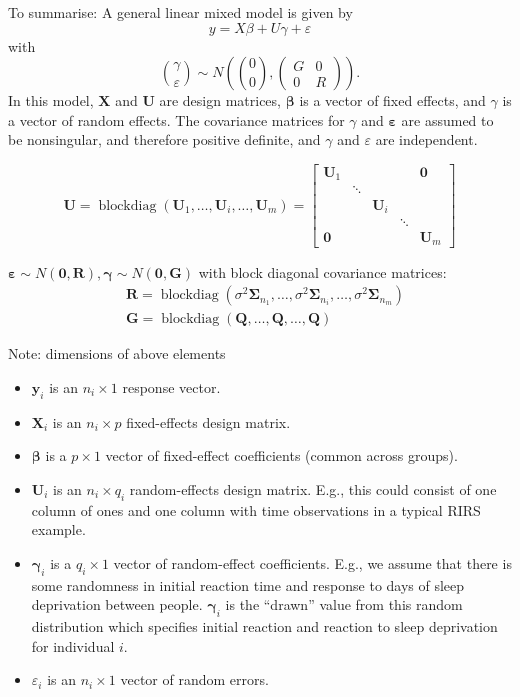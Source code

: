 \documentclass[11pt, %
	oneside, %
	english, %
	onehalfspacing, %
	]{article} %
\numberwithin{equation}{section}
\begin{document}
To summarise: A general linear mixed model is given by
$$
y=X \beta+U \gamma+\varepsilon
$$
with
$$
\binom{\gamma}{\varepsilon} \sim N\left(\binom{0}{0},\left(\begin{array}{ll}
G & 0 \\
0 & R
\end{array}\right)\right) .
$$
In this model, $\mathbf{X}$ and $\mathbf{U}$ are design matrices, $\mathbf{\beta}$ is a vector of fixed effects, and $\gamma$ is a vector of random effects. The covariance matrices for $\gamma$ and $\mathbf{\varepsilon}$ are assumed to be nonsingular, and therefore positive definite, and $\gamma$ and $\varepsilon$ are independent.

\begin{equation*}
    \mathbf{U}=\operatorname{blockdiag}\left(\mathbf{U}_1, \ldots, \mathbf{U}_i, \ldots, \mathbf{U}_m\right)=
    \begin{bmatrix}
        \mathbf{U}_1 & & & & \mathbf{0} \\
        & \ddots & & & \\
        & & \mathbf{U}_i & & \\
        & & & \ddots & \\
        \mathbf{0}& & & & \mathbf{U}_m
    \end{bmatrix}
\end{equation*}

$\mathbf{\varepsilon} \sim N (\mathbf{0}, \mathbf{R}), \mathbf{\gamma} \sim N(\mathbf{0}, \mathbf{G})$ with block diagonal covariance matrices:
\begin{align*}
    & \mathbf{R}=\operatorname{blockdiag}\left(\sigma^2 \mathbf{\Sigma}_{n_1}, \ldots, \sigma^2 \mathbf{\Sigma}_{n_i}, \ldots, \sigma^2 \mathbf{\Sigma}_{n_m}\right) \\
    & \mathbf{G}=\operatorname{blockdiag}(\mathbf{Q}, \ldots, \mathbf{Q}, \ldots, \mathbf{Q})
\end{align*}

Note: dimensions of above elements
\begin{itemize}
	\item $\boldsymbol{y}_i$ is an $n_i \times 1$ response vector.
	\item $\boldsymbol{X}_i$ is an $n_i \times p$ fixed-effects design matrix.
	\item $\boldsymbol{\beta}$ is a $p \times 1$ vector of fixed-effect coefficients (common across groups).
	\item $\boldsymbol{U}_i$ is an $n_i \times q_i$ random-effects design matrix. E.g., this could consist of one column of ones and one column with time observations in a typical RIRS example.
	\item $\boldsymbol{\gamma}_i$ is a $q_i \times 1$ vector of random-effect coefficients. E.g., we assume that there is some randomness in initial reaction time and response to days of sleep deprivation between people. $\boldsymbol{\gamma}_i$ is the ``drawn'' value from this random distribution which specifies initial reaction and reaction to sleep deprivation for individual $i$.
	\item $\varepsilon_i$ is an $n_i \times 1$ vector of random errors.
\end{itemize}
\end{document}
